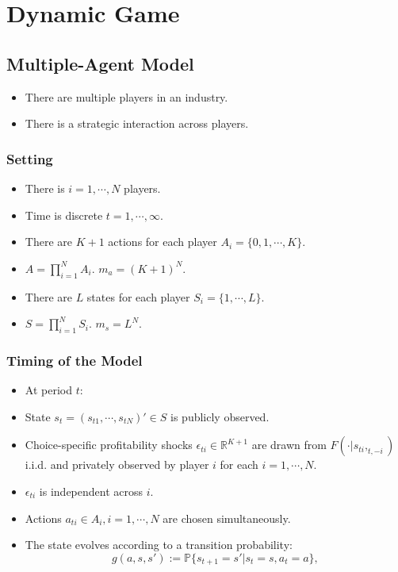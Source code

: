 \documentclass[
]{book}
\providecommand{\tightlist}{%
  \setlength{\itemsep}{0pt}\setlength{\parskip}{0pt}}
\begin{document}
\hypertarget{dynamicgame}{%
\chapter{Dynamic Game}\label{dynamicgame}}

\hypertarget{multiple-agent-model}{%
\section{Multiple-Agent Model}\label{multiple-agent-model}}

\begin{itemize}
\tightlist
\item
  There are multiple players in an industry.
\item
  There is a strategic interaction across players.
\end{itemize}

\hypertarget{setting-2}{%
\subsection{Setting}\label{setting-2}}

\begin{itemize}
\tightlist
\item
  There is \(i = 1, \cdots, N\) players.
\item
  Time is discrete \(t = 1, \cdots, \infty\).
\item
  There are \(K + 1\) actions for each player \(A_i = \{0, 1, \cdots, K\}\).
\item
  \(A = \prod_{i = 1}^N A_i\). \(m_a = (K + 1)^N\).
\item
  There are \(L\) states for each player \(S_i = \{1, \cdots, L\}\).
\item
  \(S = \prod_{i = 1}^N S_i\). \(m_s = L^N\).
\end{itemize}

\hypertarget{timing-of-the-model-1}{%
\subsection{Timing of the Model}\label{timing-of-the-model-1}}

\begin{itemize}
\tightlist
\item
  At period \(t\):
\item
  State \(s_t = (s_{t1}, \cdots, s_{tN})' \in S\) is publicly observed.
\item
  Choice-specific profitability shocks \(\epsilon_{ti} \in \mathbb{R}^{K + 1}\) are drawn from \(F(\cdot|s_{ti}, _{t,-i})\) i.i.d. and privately observed by player \(i\) for each \(i = 1, \cdots, N\).
\item
  \(\epsilon_{ti}\) is independent across \(i\).
\item
  Actions \(a_{ti} \in A_i, i = 1, \cdots, N\) are chosen simultaneously.
\item
  The state evolves according to a transition probability:
  \begin{equation}
  g(a, s, s') := \mathbb{P}\{s_{t + 1} = s'|s_t = s, a_t = a\},
  \end{equation}
\end{itemize}
\end{document}

